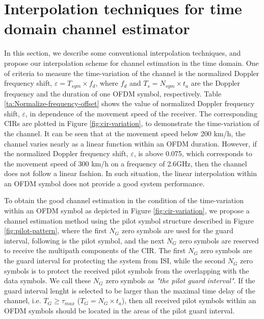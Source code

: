 \documentclass[12pt,journal,draftclsnofoot,onecolumn]{IEEEtran}
\begin{document}
\section{Interpolation techniques for time domain channel estimator}\label{section-3}
	
In this section, we describe some conventional interpolation techniques, and propose our interpolation scheme for channel estimation in the time domain. One of criteria to measure the time-variation of the channel is the normalized Doppler frequency shift, $\varepsilon = T_{sym}\times f_{d}$, where $f_{d}$ and $T_{s}=N_{sym}\times t_{a}$ are the Doppler frequency and the duration of one OFDM symbol, respectively. Table \ref{ta:Normalize-frequency-offset} shows the value of normalized Doppler frequency shift, $\varepsilon$, in dependence of the movement speed of the receiver. The corresponding CIRs are plotted in Figure \ref{fig:cir-variation}, to demonstrate the time-variation of the channel. It can be seen that at the movement speed below 200 km/h, the channel varies nearly as a linear function  within an OFDM duration. However,  if the normalized Doppler frequency shift, $\varepsilon$, is above 0.075, which corresponds to the movement speed of 300 km/h on a frequency of 2.6GHz, then the channel does not follow a linear fashion. In such situation, the linear interpolation within an OFDM symbol does not provide a good system performance.
	
To obtain the good channel estimation in the condition of the time-variation within an OFDM symbol as depicted in Figure \ref{fig:cir-variation}, we propose a channel estimation method using the pilot symbol structure described in Figure \ref{fig:pilot-pattern}, where the first $N_G$ zero symbols are used for the guard interval, following is the pilot symbol, and the next $N_G$ zero symbols are reserved to receive the multipath components of the CIR. The  first $N_G$ zero symbols are the guard interval for protecting the system from ISI, while the second  $N_G$ zero symbols is to protect the received pilot symbols from the overlapping with the data symbols. We call these  $N_G$ zero symbols as {\it{"the pilot guard interval"}}. If the guard interval lenght is selected to be larger than the maximal time delay of the channel, i.e. $T_{G} \geqslant \tau_{max}$ (${T_{G}=N_G \times t_a }$), then all received pilot symbols within an OFDM symbols should be located in the areas of the pilot guard interval.
\end{document}
